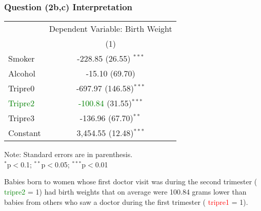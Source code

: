\documentclass[11pt, xcolor=x11names,compress]{beamer}
\begin{document}
\begin{frame}[fragile,t]
\frametitle{Question (2b,c) Interpretation} 
\begin{center}
\begin{threeparttable}
\begin{tabular}{lc} 
\hline 
 & \multicolumn{1}{c}{Dependent Variable: Birth Weight} \\ 
\cline{2-2} 
 & (1) \\ 
\hline 
 Smoker & -228.85 (26.55) $^{***}$ \\ 
  Alcohol & -15.10 (69.70)\\ 
  Tripre0 & -697.97 (146.58)$^{***}$ \\ 
  \textcolor{green}{Tripre2} & \textcolor{green}{-100.84} (31.55)$^{***}$ \\ 
  Tripre3 & -136.96 (67.70)$^{**}$ \\ 
  Constant & 3,454.55 (12.48)$^{***}$ \\ 
 \hline 
\end{tabular} 
\begin{tablenotes}[flushleft]
\footnotesize
Note: Standard errors are in parenthesis. \\
$^{*}$p$<$0.1; $^{**}$p$<$0.05; $^{***}$p$<$0.01 \\ 
\end{tablenotes}
\end{threeparttable}
\end{center}
Babies born to women whose first doctor visit was during the
second trimester ( \textcolor{green}{tripre2} = 1) had birth weights that on average
were 100.84 grams lower than babies from others who saw a
doctor during the first trimester ( \textcolor{red}{tripre1} = 1).
\end{frame}
\end{document}
